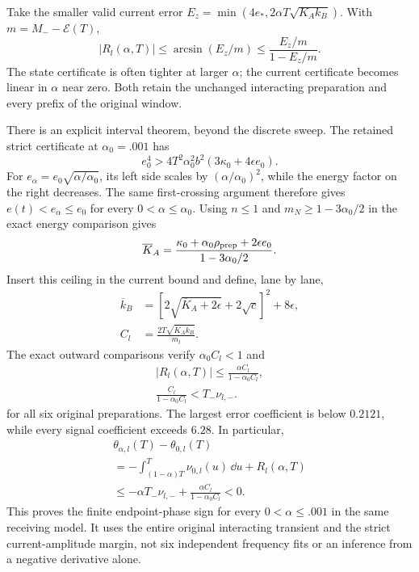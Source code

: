 Take the smaller valid current error
$E_z=\min(4e_*,2\alpha T\sqrt{K_Ak_B})$. With $m=M_--\mathcal E(T)$,
\[
 |R_l(\alpha,T)|\le\arcsin(E_z/m)
                  \le\frac{E_z/m}{1-E_z/m}.
\]
The state certificate is often tighter at larger $\alpha$; the current
certificate becomes linear in $\alpha$ near zero. Both retain the unchanged
interacting preparation and every prefix of the original window.

There is an explicit interval theorem, beyond the discrete sweep. The
retained strict certificate at $\alpha_0=.001$ has
\[
 e_0^4>4T^2\alpha_0^2b^2(3\kappa_0+4\epsilon e_0).
\]
For $e_\alpha=e_0\sqrt{\alpha/\alpha_0}$, its left side scales by
$(\alpha/\alpha_0)^2$, while the energy factor on the right decreases.
The same first-crossing argument therefore gives
$e(t)<e_\alpha\le e_0$ for every $0<\alpha\le\alpha_0$. Using
$n\le1$ and $m_N\ge1-3\alpha_0/2$ in the exact energy comparison gives
\[
 \overline K_A=
 \frac{\kappa_0+\alpha_0\rho_{\rm prep}+2\epsilon e_0}
      {1-3\alpha_0/2}.
\]
Insert this ceiling in the current bound and define, lane by lane,
\[
 \begin{aligned}
 \overline k_B&=[2\sqrt{\overline K_A+2\epsilon}+2\sqrt c]^2+8\epsilon,\\
 C_l&=\frac{2T\sqrt{\overline K_A\overline k_B}}{m_l}.
 \end{aligned}
\]
The exact outward comparisons verify $\alpha_0C_l<1$ and
\[
 \begin{gathered}
 |R_l(\alpha,T)|\le\frac{\alpha C_l}{1-\alpha_0C_l},\\
 \frac{C_l}{1-\alpha_0C_l}<T_-\nu_{l,-}.
 \end{gathered}
\]
for all six original preparations. The largest error coefficient is below
$0.2121$, while every signal coefficient exceeds $6.28$. In particular,
\[
 \begin{gathered}
 \theta_{\alpha,l}(T)-\theta_{0,l}(T)\\
 =-\int_{(1-\alpha)T}^{T}\nu_{0,l}(u)\,\dd u+R_l(\alpha,T)\\
 \le-\alpha T_-\nu_{l,-}
       +\frac{\alpha C_l}{1-\alpha_0C_l}<0.
 \end{gathered}
\]
This proves the finite endpoint-phase sign for every
$0<\alpha\le.001$ in the same receiving model. It uses the entire original
interacting transient and the strict current-amplitude margin, not six
independent frequency fits or an inference from a negative derivative alone.

